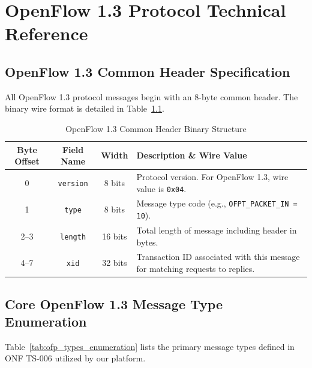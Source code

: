 \chapter{OpenFlow 1.3 Protocol Technical Reference}
\label{app:openflow}

\section{OpenFlow 1.3 Common Header Specification}
All OpenFlow 1.3 protocol messages begin with an 8-byte common header. The binary wire format is detailed in Table~\ref{tab:ofp_header_format}.

\begin{table}[htbp]
\centering
\caption{OpenFlow 1.3 Common Header Binary Structure}
\label{tab:ofp_header_format}
\small
\begin{tabularx}{\textwidth}{c c c X}
\toprule
\textbf{Byte Offset} & \textbf{Field Name} & \textbf{Width} & \textbf{Description \& Wire Value} \\
\midrule
0 & \texttt{version} & 8 bits & Protocol version. For OpenFlow 1.3, wire value is \texttt{0x04}. \\
1 & \texttt{type} & 8 bits & Message type code (e.g., \texttt{OFPT\_PACKET\_IN = 10}). \\
2--3 & \texttt{length} & 16 bits & Total length of message including header in bytes. \\
4--7 & \texttt{xid} & 32 bits & Transaction ID associated with this message for matching requests to replies. \\
\bottomrule
\end{tabularx}
\end{table}

\section{Core OpenFlow 1.3 Message Type Enumeration}
Table~\ref{tab:ofp_types_enumeration} lists the primary message types defined in ONF TS-006 \cite{onf2012openflow} utilized by our platform.

